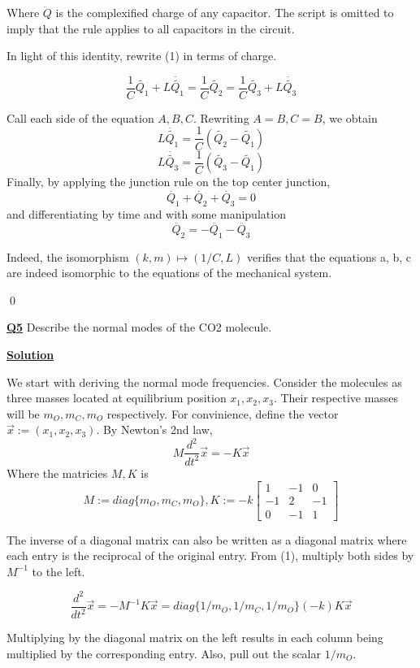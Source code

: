 \documentclass{article}
\newcommand{\new}[1]{
    \vspace{2mm}
    \noindent
    \textbf{
    \underline{#1}}
}
\begin{document}
Where $\ddot{Q}$ is the complexified charge of any capacitor. 
The script is omitted to imply that the rule applies to all 
capacitors in the circuit. 

In light of this identity, rewrite (1) in terms of charge. 

\[
    \frac{1}{C}\tilde{Q_1}+L\ddot{\tilde{Q_1}}
    = 
    \frac{1}{C}\tilde{Q_2}
    = 
    \frac{1}{C}\tilde{Q_3} + L\ddot{\tilde{Q_3}}
\]

Call each side of the equation $A, B, C$. Rewriting 
$A = B , C = B $, we obtain 
\[
    L\ddot{\tilde{Q_1}} = \frac{1}{C}(\tilde{Q_2} - \tilde{Q_1})
    \tag{a}
\]
\[
    L\ddot{\tilde{Q_3}} = \frac{1}{C}(\tilde{Q_3} - \tilde{Q_1})
    \tag{b}
\]
Finally, by applying the junction rule on the top center junction, 
\[
    \dot{Q_1} + \dot{Q_2} + \dot{Q_3} = 0
\]
and differentiating by time and with some manipulation 
\[
    \ddot{Q_2} = -\ddot{Q_1}-\ddot{Q_3}
    \tag{c}
\]

Indeed, the isomorphism $(k, m) \mapsto (1/C, L)$ 
verifies that the equations a, b, c are indeed isomorphic 
to the equations of the mechanical system. 

\qed


\new{Q5} Describe the normal modes of the CO2 molecule. 

\new{Solution}
We start with deriving the normal mode frequencies. 
Consider the molecules as three masses located 
at equilibrium position $x_1, x_2, x_3$. Their respective 
masses will be $m_O, m_C, m_O$ respectively. For 
convinience, define the vector $\vec{x} := (x_1, x_2, x_3)$. 
By Newton's 2nd law, 
\[
    M\frac{d^2}{dt^2} \vec{x} = -K \vec{x}
    \tag{1}
\]
Where the matricies $M, K$ is 
\[
    M := diag\{m_O, m_C, m_O\}, K:=-k
    \begin{bmatrix}
        1 & -1 & 0\\
        -1 & 2 & -1\\
        0 & -1 & 1
    \end{bmatrix}
\]

The inverse of a diagonal matrix can also be 
written as a diagonal matrix where each entry is the 
reciprocal of the original entry. From (1), multiply 
both sides by $M^{-1}$ to the left. 

\[
    \frac{d^2}{dt^2}\vec{x} = -M^{-1}K \vec{x}
=
diag\{1/m_O, 1/m_C, 1/m_O\} (-k) K \vec{x}
    \]

Multiplying by the diagonal matrix on the left results in 
each column being multiplied by the corresponding entry. Also, 
pull out the scalar $1/m_O$. 
\end{document}
